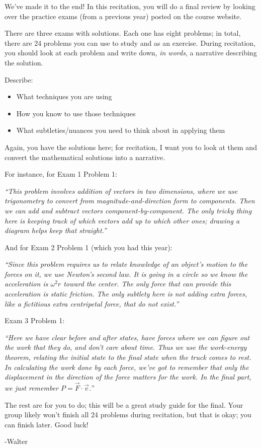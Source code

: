 \documentclass[12pt]{article}
\begin{document}
\Large
\centerline{}
\normalsize
\centerline{}

We've made it to the end! In this recitation, you will do a final review by looking over the practice exams (from a previous year) posted on the course website.

There are three exams with solutions. Each one has eight problems; in total, there are 24 problems you can use to study and as an exercise. During recitation, you should look at each problem and write down, {\it in words}, a narrative describing the solution. 

Describe:

\begin{itemize}
	\item What techniques you are using
	\item How you know to use those techniques
	\item What subtleties/nuances you need to think about in applying them
\end{itemize}

Again, you have the solutions here; for recitation, I want you to look at them and convert the mathematical solutions into a narrative. 

For instance, for Exam 1 Problem 1:

\it ``This problem involves addition of vectors in two dimensions, where we use trigonometry to convert from magnitude-and-direction form to components. Then we can add and subtract vectors component-by-component. The only tricky thing here is keeping track of which vectors add up to which other ones; drawing a diagram helps keep that straight.''

\rm And for Exam 2 Problem 1 (which you had this year):

\it ``Since this problem requires us to relate knowledge of an object's motion to the forces on it, we use Newton's second law. It is going in a circle so we know the acceleration is $\omega^2 r$ toward the center. The only force that can provide this acceleration is static friction. The only subtlety here is not adding extra forces, like a fictitious extra centripetal force, that do not exist.''

\rm Exam 3 Problem 1:

\it ``Here we have clear before and after states, have forces where we can figure out the work that they do, and don't care about time. Thus we use the work-energy theorem, relating the initial state to the final state when the truck comes to rest. In calculating the work done by each force, we've got to remember that only the displacement in the direction of the force matters for the work. In the final part, we just remember $P=\vec F \cdot \vec v$.''
	\rm
	
The rest are for you to do; this will be a great study guide for the final. Your group likely won't finish all 24 problems during recitation, but that is okay; you can finish later. Good luck!

-Walter





 
\end{document}
